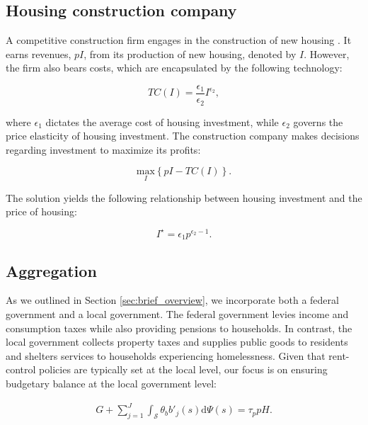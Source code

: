 \documentclass[parskip=full]{article}
\begin{document}
\subsection{Housing construction company}\label{sec:construction_company}

A competitive construction firm engages in the construction of new housing \citep{rotberg-2022}. It earns revenues, $pI$, from its production of new housing, denoted by $I$. However, the firm also bears costs, which are encapsulated by the following technology:

\begin{equation*}
TC(I)=\frac{\epsilon_{1}}{\epsilon_{2}}I^{\epsilon_{2}}\label{eq:total_cost_structure},
\end{equation*}

\noindent where $\epsilon_{1}$ dictates the average cost of housing investment, while $\epsilon_{2}$ governs the price elasticity of housing investment. The construction company makes decisions regarding investment to maximize its profits:

\begin{equation*}
\label{eq:construction_company_profits}
\underset{I} {\text{$\mbox{max}$}}{\left\{p I-TC(I)\right\}}.
\end{equation*}

\noindent The solution yields the following relationship between housing investment and the price of housing:

\begin{equation}
\label{eq:construction_company_first_order_condition}
I^{\star}=\epsilon_{1} p^{\epsilon_{2}-1}.
\end{equation}

\subsection{Aggregation}\label{subsection:aggregation}

As we outlined in Section \ref{sec:brief_overview}, we incorporate both a federal government and a local government. The federal government levies income and consumption taxes while also providing pensions to households. In contrast, the local government collects property taxes and supplies public goods to residents and shelters services to households experiencing homelessness. Given that rent-control policies are typically set at the local level, our focus is on ensuring budgetary balance at the local government level:

\begin{align}\label{eq:gbc}
  G + \sum_{j=1}^J \int_\mathcal{S} \theta_{b} b'_{j}(s)\mathrm{d}\Psi(s)  = \tau_{p} p H.
\end{align}
\end{document}
